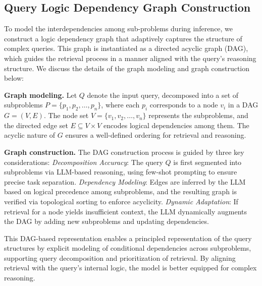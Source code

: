 \documentclass[letterpaper]{article} %
\begin{document}




\subsection{Query Logic Dependency Graph Construction}

To model the interdependencies among sub-problems during inference, we construct a logic dependency graph that adaptively captures the structure of complex queries. This graph is instantiated as a directed acyclic graph (DAG), which guides the retrieval process in a manner aligned with the query's reasoning structure. We discuss the details of the graph modeling and graph construction below:

\textbf{Graph modeling.} Let \( Q \) denote the input query, decomposed into a set of subproblems \( P = \{p_1, p_2, \dots, p_n\} \), where each \( p_i \) corresponds to a node \( v_i \) in a DAG \( G = (V, E) \). The node set \( V = \{v_1, v_2, \dots, v_n\} \) represents the subproblems, and the directed edge set \( E \subseteq V \times V \) encodes logical dependencies among them. The acyclic nature of \( G \) ensures a well-defined ordering for retrieval and reasoning.

\textbf{Graph construction.} 
The DAG construction process is guided by three key considerations:  
 \textit{Decomposition Accuracy}: The query \( Q \) is first segmented into subproblems via LLM-based reasoning, using few-shot prompting to ensure precise task separation.  
 \textit{Dependency Modeling}: Edges are inferred by the LLM based on logical precedence among subproblems, and the resulting graph is verified via topological sorting to enforce acyclicity.  
 \textit{Dynamic Adaptation}: If retrieval for a node yields insufficient context, the LLM dynamically augments the DAG by adding new subproblems and updating dependencies.


This DAG-based representation enables a principled representation of the query structures by explicit modeling of conditional dependencies across subproblems, supporting query decomposition and prioritization of retrieval. By aligning retrieval with the query's internal logic, the model is better equipped for complex reasoning.


\end{document}
